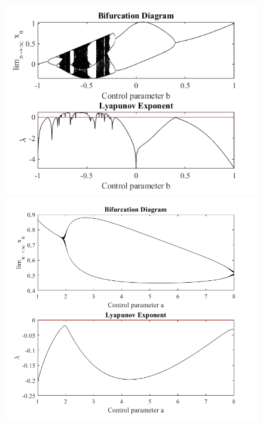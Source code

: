 \documentclass[a4paper,12pt,notitlepage]{article}
\begin{document}
\begin{figure}[h]
    \centering
        \centering
        \includegraphics[width=\textwidth]{a=7_5.png} 

        \centering
        \includegraphics[width=\textwidth]{b=03921.png} 
\end{figure}
\end{document}
